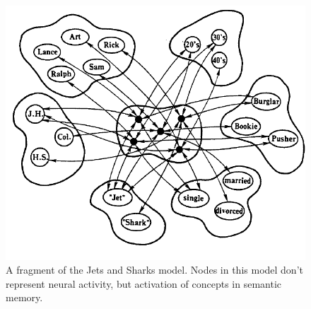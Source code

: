 \begin{figure}[h]
\centering
\includegraphics[scale=.3]{./images/IAC_JetsSharks.png}
\caption[From McClelland and Rumelhart, 1989 \cite{mcclelland1989explorations}.]{A fragment of the Jets and Sharks model. Nodes in this model don't represent neural activity, but activation of concepts in semantic memory.}
\label{iac}
\end{figure}




